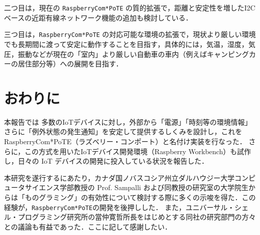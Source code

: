 二つ目は，現在の {\tt Raspberry\-Com*PoTE} の質的拡張で，距離と安定性を増したI2Cベースの近距有線ネットワーク機能の追加も検討している．


三つ目は，{\tt Raspberry\-Com*PoTE} の対応可能な環境の拡張で，現状より厳しい環境でも長期間に渡って安定に動作することを目指す，具体的には，気温，湿度，気圧，振動などが現在の「室内」より厳しい自動車の車内（例えばキャンピングカーの居住部分等）への展開を目指す．




\section{おわりに}
\label{sec:07conclusion}

本報告では
多数のIoTデバイスに対し，外部から「電源」「時刻等の環境情報」さらに「例外状態の発生通知」を安定して提供するしくみを設計し，これを RaspberryCom*PoTE（ラズベリー・コンポート）と名付け実装を行なった．
さらに，この方式を用いたIoTデバイス開発環境（Raspberry Workbench）も試作し，日々の IoT デバイスの開発に投入している状況を報告した．





\begin{acknowledgment}

 本研究を遂行するにあたり，カナダ国ノバスコシア州立ダルハウジー大学コンピュータサイエンス学部教授の Prof. Sampalli および同教授の研究室の大学院生からは「ものグラミング」の有効性について検討する際に多くの示唆を得た．この経験が，{\tt Raspberry\-Com*PoTE}の開発を後押しした．
      また，ユニバーサル・シェル・プログラミング研究所の當仲寛哲所長をはじめとする同社の研究部門の方々との議論も有益であった．ここに記して感謝したい．

\end{acknowledgment}


